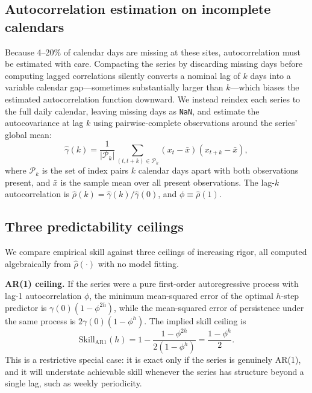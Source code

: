 \documentclass{article}
\begin{document}
\subsection{Autocorrelation estimation on incomplete calendars}
\label{sec:acf_method}

Because 4--20\% of calendar days are missing at these sites, autocorrelation
must be estimated with care.
Compacting the series by discarding missing days before computing lagged
correlations silently converts a nominal lag of $k$ days into a variable
calendar gap---sometimes substantially larger than $k$---which biases the
estimated autocorrelation function downward.
We instead reindex each series to the full daily calendar, leaving missing
days as \texttt{NaN}, and estimate the autocovariance at lag $k$ using
pairwise-complete observations around the series' global mean:
\begin{equation}
  \hat\gamma(k) = \frac{1}{|\mathcal{P}_k|}
  \sum_{(t,t+k)\in\mathcal{P}_k} (x_t-\bar{x})(x_{t+k}-\bar{x}),
\end{equation}
where $\mathcal{P}_k$ is the set of index pairs $k$ calendar days apart with
both observations present, and $\bar{x}$ is the sample mean over all present
observations.
The lag-$k$ autocorrelation is $\hat\rho(k)=\hat\gamma(k)/\hat\gamma(0)$, and
$\phi \equiv \hat\rho(1)$.

\subsection{Three predictability ceilings}
\label{sec:bounds}

We compare empirical skill against three ceilings of increasing rigor, all
computed algebraically from $\hat\rho(\cdot)$ with no model fitting.

\textbf{AR(1) ceiling.}
If the series were a pure first-order autoregressive process with lag-1
autocorrelation $\phi$, the minimum mean-squared error of the optimal $h$-step
predictor is $\gamma(0)(1-\phi^{2h})$, while the mean-squared error of
persistence under the same process is $2\gamma(0)(1-\phi^{h})$.
The implied skill ceiling is
\begin{equation}
  \mathrm{Skill}_{\mathrm{AR1}}(h) = 1 -
  \frac{1-\phi^{2h}}{2(1-\phi^{h})} = \frac{1-\phi^h}{2}.
  \label{eq:ar1}
\end{equation}
This is a restrictive special case: it is exact only if the series is
genuinely AR(1), and it will understate achievable skill whenever the series
has structure beyond a single lag, such as weekly periodicity.
\end{document}
